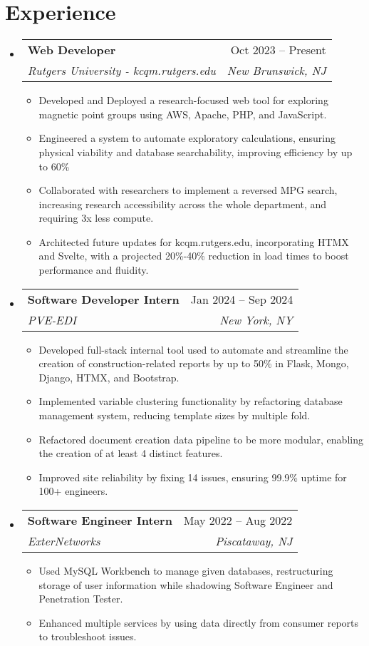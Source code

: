 \documentclass[letterpaper,12pt]{article}
\makeatletter
\newcommand{\resumeItem}[1]{
  \item\small{
    {#1 \vspace{-4pt}}
  }
}
\newcommand{\resumeSubheading}[4]{
  \vspace{-2pt}\item
    \begin{tabular*}{0.97\textwidth}[t]{l@{\extracolsep{\fill}}r}
      \textbf{#1} & #2 \\
      \textit{\small#3} & \textit{\small #4} \\
    \end{tabular*}\vspace{-7pt}
}
\newcommand{\resumeSubHeadingListStart}{\begin{itemize}[leftmargin=0.15in, label={}]}
\newcommand{\resumeSubHeadingListEnd}{\end{itemize}}
\newcommand{\resumeItemListStart}{\begin{itemize}}
\newcommand{\resumeItemListEnd}{\end{itemize}\vspace{-5pt}}
\makeatother
\begin{document}
\section{Experience}
  \resumeSubHeadingListStart
    \resumeSubheading
      {Web Developer}{Oct 2023 -- Present}
      {Rutgers University - kcqm.rutgers.edu}{New Brunswick, NJ}
      \resumeItemListStart
        \resumeItem{Developed and Deployed a research-focused web tool for exploring magnetic point groups using AWS, Apache, PHP, and JavaScript.}
        \resumeItem{Engineered a system to automate exploratory calculations, ensuring physical viability and database searchability, improving efficiency by up to 60\% }
        \resumeItem{Collaborated with researchers to implement a reversed MPG search, increasing research accessibility across the whole department, and requiring 3x less compute.}
        \resumeItem{Architected future updates for kcqm.rutgers.edu, incorporating HTMX and Svelte, with a projected 20\%-40\% reduction in load times to boost performance and fluidity.}
      \resumeItemListEnd
      \resumeSubheading
      {Software Developer Intern}{Jan 2024 -- Sep 2024}
      {PVE-EDI}{New York, NY}
      \resumeItemListStart
        \resumeItem{Developed full-stack internal tool used to automate and streamline the creation of construction-related reports by up to 50\% in Flask, Mongo, Django, HTMX, and Bootstrap. }
        \resumeItem{Implemented variable clustering functionality by refactoring database management system, reducing template sizes by multiple fold.}
        \resumeItem{Refactored document creation data pipeline to be more modular, enabling the creation of at least 4 distinct features.}
        \resumeItem{Improved site reliability by fixing 14 issues, ensuring 99.9\% uptime for 100+ engineers.}
      \resumeItemListEnd
      \resumeSubheading
      {Software Engineer Intern}{May 2022 -- Aug 2022}
      {ExterNetworks}{Piscataway, NJ}
      \resumeItemListStart
        \resumeItem{Used MySQL Workbench to manage given databases, restructuring storage of user information while shadowing Software Engineer and Penetration Tester.}
        \resumeItem{Enhanced multiple services by using data directly from consumer reports to troubleshoot issues.}
      \resumeItemListEnd
  \resumeSubHeadingListEnd
\end{document}
